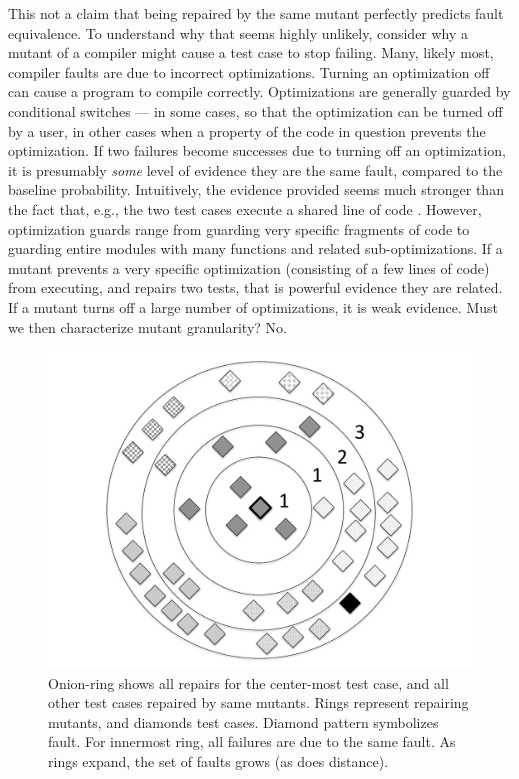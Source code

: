 This not a claim that being repaired by the same mutant perfectly predicts fault equivalence.  To understand why that seems highly unlikely, consider why a mutant of a compiler might cause a test case to stop failing.  Many, likely most, compiler faults are due to incorrect optimizations.  Turning an optimization off can cause a program to compile correctly.  Optimizations are generally guarded by conditional switches --- in some cases, so that the optimization can be turned off by a user, in other cases when a property of the code in question prevents the optimization.  If two failures become successes due to turning off an optimization, it is presumably \emph{some} level of evidence they are the same fault, compared to the baseline probability.  Intuitively, the evidence provided seems much stronger than the fact that, e.g., the two test cases execute a shared line of code \cite{RepsSpectra}.  However, optimization guards range from guarding very specific fragments of code to guarding entire modules with many functions and related sub-optimizations.  If a mutant prevents a very specific optimization (consisting of a few lines of code) from executing, and repairs two tests, that is powerful evidence they are related.  If a mutant turns off a large number of optimizations, it is weak evidence.  Must we then characterize mutant granularity?  No.

\begin{figure}
\centering
\includegraphics[width=0.4\columnwidth]{onionring}
\caption{\scriptsize{Onion-ring shows all repairs for the center-most test case, and all other test cases repaired by same mutants.  Rings represent repairing mutants, and diamonds test cases.  Diamond pattern symbolizes fault.  For innermost ring, all failures are due to the same fault.  As rings expand, the set of faults grows (as does distance).}}
\vspace{-0.1in}
\label{fig:onion}
\end{figure}


